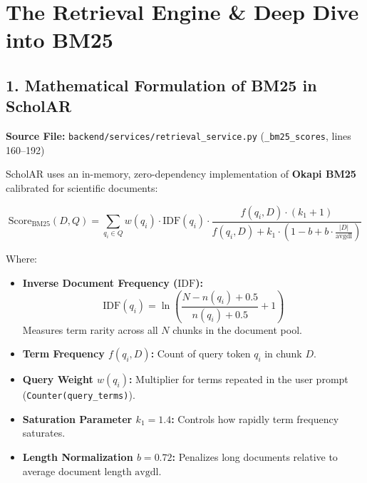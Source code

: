 \documentclass[10pt,a4paper]{article}
\begin{document}
\newpage

\section{The Retrieval Engine \& Deep Dive into BM25}

\subsection{1. Mathematical Formulation of BM25 in ScholAR}
\textbf{Source File:} \texttt{backend/services/retrieval\_service.py} (\texttt{\_bm25\_scores}, lines 160--192)

ScholAR uses an in-memory, zero-dependency implementation of \textbf{Okapi BM25} calibrated for scientific documents:

\begin{equation}
\text{Score}_{\text{BM25}}(D, Q) = \sum_{q_i \in Q} w(q_i) \cdot \text{IDF}(q_i) \cdot \frac{f(q_i, D) \cdot (k_1 + 1)}{f(q_i, D) + k_1 \cdot \left(1 - b + b \cdot \frac{|D|}{\text{avgdl}}\right)}
\end{equation}

Where:
\begin{itemize}[leftmargin=1.5em, itemsep=2pt]
    \item \textbf{Inverse Document Frequency ($\text{IDF}$):}
    $$\text{IDF}(q_i) = \ln\left( \frac{N - n(q_i) + 0.5}{n(q_i) + 0.5} + 1 \right)$$
    Measures term rarity across all $N$ chunks in the document pool.
    \item \textbf{Term Frequency $f(q_i, D)$:} Count of query token $q_i$ in chunk $D$.
    \item \textbf{Query Weight $w(q_i)$:} Multiplier for terms repeated in the user prompt (\texttt{Counter(query\_terms)}).
    \item \textbf{Saturation Parameter $k_1 = 1.4$:} Controls how rapidly term frequency saturates.
    \item \textbf{Length Normalization $b = 0.72$:} Penalizes long documents relative to average document length $\text{avgdl}$.
\end{itemize}
\end{document}
